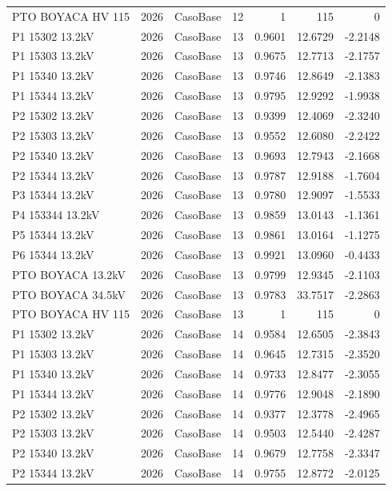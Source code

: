 \documentclass[11pt,a4paper]{article}
\begin{document}
\begin{longtable}{llllrrr}
PTO BOYACA HV 115 & 2026 & CasoBase & 12 & 1 & 115 & 0 \\
P1 15302 13.2kV & 2026 & CasoBase & 13 & 0.9601 & 12.6729 & -2.2148 \\
P1 15303 13.2kV & 2026 & CasoBase & 13 & 0.9675 & 12.7713 & -2.1757 \\
P1 15340 13.2kV & 2026 & CasoBase & 13 & 0.9746 & 12.8649 & -2.1383 \\
P1 15344 13.2kV & 2026 & CasoBase & 13 & 0.9795 & 12.9292 & -1.9938 \\
P2 15302 13.2kV & 2026 & CasoBase & 13 & 0.9399 & 12.4069 & -2.3240 \\
P2 15303 13.2kV & 2026 & CasoBase & 13 & 0.9552 & 12.6080 & -2.2422 \\
P2 15340 13.2kV & 2026 & CasoBase & 13 & 0.9693 & 12.7943 & -2.1668 \\
P2 15344 13.2kV & 2026 & CasoBase & 13 & 0.9787 & 12.9188 & -1.7604 \\
P3 15344 13.2kV & 2026 & CasoBase & 13 & 0.9780 & 12.9097 & -1.5533 \\
P4 153344 13.2kV & 2026 & CasoBase & 13 & 0.9859 & 13.0143 & -1.1361 \\
P5 15344 13.2kV & 2026 & CasoBase & 13 & 0.9861 & 13.0164 & -1.1275 \\
P6 15344 13.2kV & 2026 & CasoBase & 13 & 0.9921 & 13.0960 & -0.4433 \\
PTO BOYACA 13.2kV & 2026 & CasoBase & 13 & 0.9799 & 12.9345 & -2.1103 \\
PTO BOYACA 34.5kV & 2026 & CasoBase & 13 & 0.9783 & 33.7517 & -2.2863 \\
PTO BOYACA HV 115 & 2026 & CasoBase & 13 & 1 & 115 & 0 \\
P1 15302 13.2kV & 2026 & CasoBase & 14 & 0.9584 & 12.6505 & -2.3843 \\
P1 15303 13.2kV & 2026 & CasoBase & 14 & 0.9645 & 12.7315 & -2.3520 \\
P1 15340 13.2kV & 2026 & CasoBase & 14 & 0.9733 & 12.8477 & -2.3055 \\
P1 15344 13.2kV & 2026 & CasoBase & 14 & 0.9776 & 12.9048 & -2.1890 \\
P2 15302 13.2kV & 2026 & CasoBase & 14 & 0.9377 & 12.3778 & -2.4965 \\
P2 15303 13.2kV & 2026 & CasoBase & 14 & 0.9503 & 12.5440 & -2.4287 \\
P2 15340 13.2kV & 2026 & CasoBase & 14 & 0.9679 & 12.7758 & -2.3347 \\
P2 15344 13.2kV & 2026 & CasoBase & 14 & 0.9755 & 12.8772 & -2.0125 \\

\end{longtable}
\end{document}
